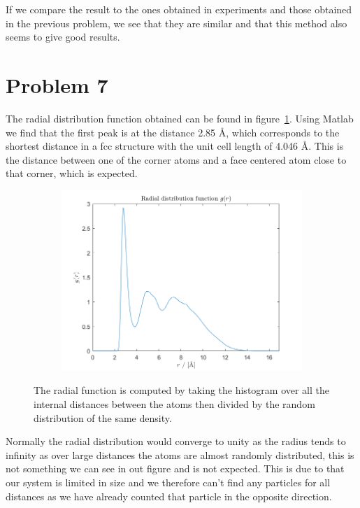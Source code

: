 If we compare the result to the ones obtained in experiments and those obtained in the previous problem, we see that they are similar and that this method also seems to give good results.

\section*{Problem 7}

The radial distribution function obtained can be found in figure~\ref{fig:radial}. Using Matlab we find that the first peak is at the distance 2.85 \r{A}, which corresponds to the shortest distance in a fcc structure with the unit cell length of 4.046 \r{A}. This is the distance between one of the corner atoms and a face centered atom close to that corner, which is expected.

\begin{figure}[H]
\centering
\captionsetup[subfigure]{justification=centering}
\begin{subfigure}[b]{0.40\textwidth}
	\centering
	\includegraphics[width=\textwidth]{graphics/task7/radial.png}
\end{subfigure}
\caption{The radial function is computed by taking the histogram over all the internal distances between the atoms then divided by the random distribution of the same density.}
\label{fig:radial}
\end{figure}

Normally the radial distribution would converge to unity as the radius tends to infinity as over large distances the atoms are almost randomly distributed, this is not something we can see in out figure and is not expected. This is due to that our system is limited in size and we therefore can't find any particles for all distances as we have already counted that particle in the opposite direction.


